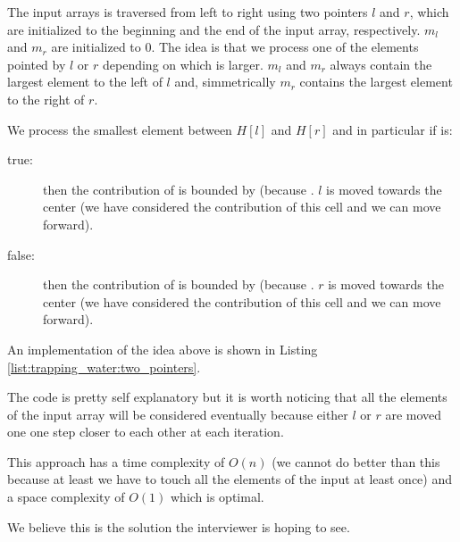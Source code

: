 The input arrays is traversed from left to right using two pointers $l$ and $r$, which are initialized to the beginning and the end of the input array, respectively.
$m_l$ and $m_r$ are initialized to $0$.
The idea is that we process one of the elements pointed by $l$ or $r$ depending on which is larger. 
$m_l$ and $m_r$ always contain the largest element to the left of $l$ and, simmetrically $m_r$ contains the largest element to the right of $r$. 

We process the smallest element between $H[l]$ and $H[r]$ and in particular if  is:
\begin{description}
	\item[true:]  then the contribution of  is bounded by  (because . $l$ is moved towards the center (we have considered the contribution of this cell and we can move forward).\\
	\item[false:] then the contribution of  is bounded by  (because . $r$ is moved towards the center (we have considered the contribution of this cell and we can move forward). \\
\end{description}

An implementation of the idea above is shown in Listing \ref{list:trapping_water:two_pointers}.



The code is pretty self explanatory but it is worth noticing that all the elements of the input array will be  considered eventually because either $l$ or $r$ are moved one one step closer to each other at each iteration. 

This approach has a time complexity of $O(n)$ (we cannot do better than this because at least we have to touch all the elements of the input at least once) and a space complexity of $O(1)$ which is optimal.

We believe this is the solution the interviewer is hoping to see. 



